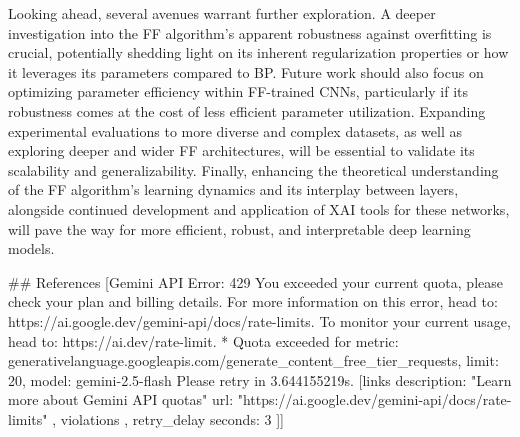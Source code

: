 \documentclass{article}
\begin{document}
Looking ahead, several avenues warrant further exploration. A deeper investigation into the FF algorithm's apparent robustness against overfitting is crucial, potentially shedding light on its inherent regularization properties or how it leverages its parameters compared to BP. Future work should also focus on optimizing parameter efficiency within FF-trained CNNs, particularly if its robustness comes at the cost of less efficient parameter utilization. Expanding experimental evaluations to more diverse and complex datasets, as well as exploring deeper and wider FF architectures, will be essential to validate its scalability and generalizability. Finally, enhancing the theoretical understanding of the FF algorithm's learning dynamics and its interplay between layers, alongside continued development and application of XAI tools for these networks, will pave the way for more efficient, robust, and interpretable deep learning models.

\#\# References
[Gemini API Error: 429 You exceeded your current quota, please check your plan and billing details. For more information on this error, head to: https://ai.google.dev/gemini-api/docs/rate-limits. To monitor your current usage, head to: https://ai.dev/rate-limit.
* Quota exceeded for metric: generativelanguage.googleapis.com/generate_content_free_tier_requests, limit: 20, model: gemini-2.5-flash
Please retry in 3.644155219s. [links {
description: "Learn more about Gemini API quotas"
url: "https://ai.google.dev/gemini-api/docs/rate-limits"
}
, violations {
}
, retry_delay {
seconds: 3
}
]]
\end{document}
